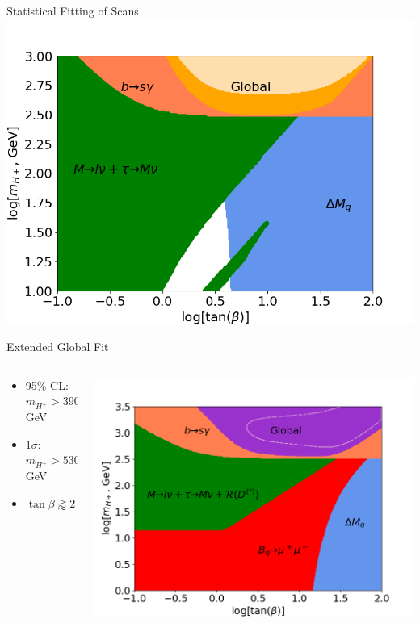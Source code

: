 \documentclass[10pt,xcolor={table,dvipsnames},t]{beamer}
\begin{document}
\begin{frame}{Statistical Fitting of Scans}
    \includegraphics[scale=0.35]{global_08}
\end{frame}

\begin{frame}{Extended Global Fit}
    \begin{columns}[c]
        \begin{column}{0.37\textwidth}
            \begin{itemize}
                \item 95\% CL: $m_{H^+}>390\,$GeV
                \item $1\sigma$: $m_{H^+}>530\,$GeV
                \item $\tan\beta\gtrapprox2$
            \end{itemize}
        \end{column}
        \begin{column}{0.60\textwidth}
            \includegraphics[scale=0.35]{global_lines.png}
        \end{column}
    \end{columns}
\end{frame}
\end{document}
